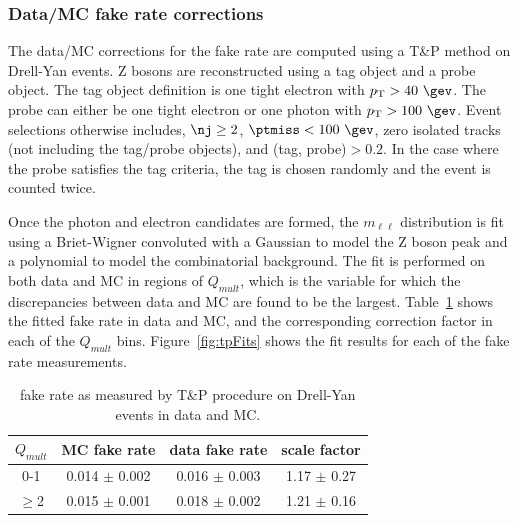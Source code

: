 \subsubsection{Data/MC fake rate corrections}

The data/MC corrections for the fake rate are computed using a T\&P method on 
Drell-Yan events.  Z bosons are reconstructed using a tag object and a probe object.    
The tag object definition is one tight electron with $\pt>40~\gev$.  The probe
can either be one tight electron or one photon with $\pt>100~\gev$. Event selections
otherwise includes, $\nj\geq2$, $\ptmiss<100~\gev$, zero isolated tracks 
(not including the tag/probe objects), and \dR(tag, probe)$>0.2$. 
In the case where the probe satisfies the tag criteria, the tag is chosen
randomly and the event is counted twice. 

Once the photon and electron candidates are formed, the $m_{\ell\ell}$ distribution
is fit using a Briet-Wigner convoluted with a Gaussian to model the Z boson peak and
a polynomial to model the combinatorial background.  The fit is performed on 
both data and MC in regions of $Q_{mult}$, which is the variable for which 
the discrepancies between data and MC are found to be the largest. Table~\ref{tab:fakeRateCorrections}
shows the fitted fake rate in data and MC, and the corresponding correction
factor in each of the $Q_{mult}$ bins. Figure~\ref{fig:tpFits} shows the 
fit results for each of the fake rate measurements.

\begin{table}[h!]
\centering
\caption{fake rate as measured by T\&P procedure on Drell-Yan events in data and MC.}
\label{tab:fakeRateCorrections}
\begin{tabular}{c|c|c|c}
\hline
$Q_{mult}$ & MC fake rate    & data fake rate  & scale factor \\ \hline\hline

0-1        & 0.014 $\pm$ 0.002    & 0.016 $\pm$ 0.003    & 1.17 $\pm$ 0.27  \\ \hline
$\geq$2    & 0.015 $\pm$ 0.001    & 0.018 $\pm$ 0.002    & 1.21 $\pm$ 0.16  \\ \hline
\end{tabular}
\end{table}

